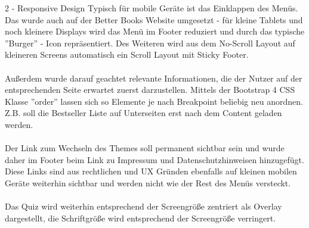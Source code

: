 \documentclass[a4paper]{article}
\begin{document}
\begin{exercise}{2 - Responsive Design} 
Typisch für mobile Geräte ist das Einklappen des Menüs. Das wurde auch auf der Better Books Website umgesetzt - für kleine Tablets und noch kleinere Displays wird das Menü im Footer reduziert und durch das typische ''Burger'' - Icon repräsentiert. Des Weiteren wird aus dem No-Scroll Layout auf kleineren Screens automatisch ein Scroll Layout mit Sticky Footer.\\\\
Außerdem wurde darauf geachtet relevante Informationen, die der Nutzer auf der entsprechenden Seite erwartet zuerst darzustellen. Mittels der Bootstrap 4 CSS Klasse ''order'' lassen sich so Elemente je nach Breakpoint beliebig neu anordnen. Z.B. soll die Bestseller Liste auf Unterseiten erst nach dem Content geladen werden.\\\\
Der Link zum Wechseln des Themes soll permanent sichtbar sein und wurde daher im Footer beim Link zu Impressum und Datenschutzhinweisen hinzugefügt. Diese Links sind aus rechtlichen und UX Gründen ebenfalls auf kleinen mobilen Geräte weiterhin sichtbar und werden nicht wie der Rest des Menüs versteckt.\\\\
Das Quiz wird weiterhin entsprechend der Screengröße zentriert als Overlay dargestellt, die Schriftgröße wird entsprechend der Screengröße verringert.


\end{exercise}
\end{document}
